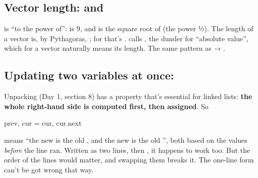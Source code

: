 \documentclass[10pt,a4paper]{article}
\begin{document}
\subsection{Vector length: \code{**} and }
\code{**} is “to the power of”:  is 9, and  is the square root of  (the power ½). The length of a vector  is, by Pythagoras, ; for  that’s .
 calls , the dunder for “absolute value”, which for a vector naturally means its length. The same pattern as  → .
\subsection{Updating two variables at once: }
Unpacking (Day 1, section 8) has a property that’s essential for linked lists: \textbf{the whole right-hand side is computed first, then assigned}. So
\begin{pycode}
prev, cur = cur, cur.next
\end{pycode}
means “the new  is the old , and the new  is the old ”, both based on the values \emph{before} the line ran. Written as two lines,  then , it happens to work too. But the order of the lines would matter, and swapping them breaks it. The one-line form can’t be got wrong that way.
\end{document}
